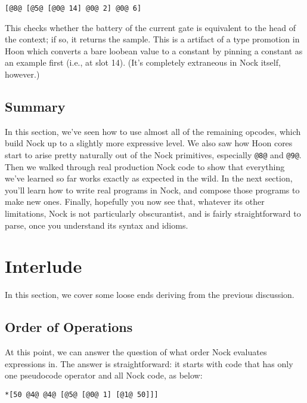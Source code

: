 \documentclass[twoside]{article}
\begin{document}
\begin{lstlisting}[style=listingblock]
[@8@ [@5@ [@0@ 14] @0@ 2] @0@ 6]
\end{lstlisting}

This checks whether the battery of the current gate is equivalent to the head of the context; if so, it returns the sample.  This is a artifact of a type promotion in Hoon which converts a bare loobean value to a constant by pinning a constant as an example first (i.e., at slot 14).  (It's completely extraneous in Nock itself, however.)

\subsection{Summary}

In this section, we've seen how to use almost all of the remaining opcodes, which build Nock up to a slightly more expressive level. We also saw how Hoon cores start to arise pretty naturally out of the Nock primitives, especially \lstinline[style=inlinecode]{@8@} and \lstinline[style=inlinecode]{@9@}. Then we walked through real production Nock code to show that everything we've learned so far works exactly as expected in the wild.  In the next section, you'll learn how to write real programs in Nock, and compose those programs to make new ones.  Finally, hopefully you now see that, whatever its other limitations, Nock is not particularly obscurantist, and is fairly straightforward to parse, once you understand its syntax and idioms.

\section{Interlude}

In this section, we cover some loose ends deriving from the previous discussion.

\subsection{Order of Operations}

At this point, we can answer the question of what order Nock evaluates expressions in.  The answer is straightforward: it starts with code that has only one pseudocode operator and all Nock code, as below:

\begin{lstlisting}[style=listingblock]
*[50 @4@ @4@ [@5@ [@0@ 1] [@1@ 50]]]
\end{lstlisting}
\end{document}
